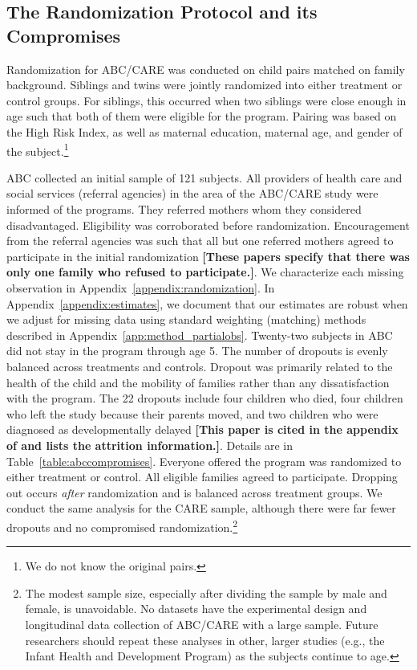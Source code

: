 \subsection{The Randomization Protocol and its Compromises} \label{section:randomization}

Randomization for ABC/CARE was conducted on child pairs matched on family background. Siblings and twins were jointly randomized into either treatment or control groups. For siblings, this occurred when two siblings were close enough in age such that both of them were eligible for the program. Pairing was based on the High Risk Index, as well as maternal education, maternal age, and gender of the subject.\footnote{We do not know the original pairs.} 

ABC collected an initial sample of 121 subjects. All providers of health care and social services (referral agencies) in the area of the ABC/CARE study were informed of the programs. They referred mothers whom they considered disadvantaged. Eligibility was corroborated before randomization. Encouragement from the referral agencies was such that all but one referred mothers agreed to participate in the initial randomization \citep{Ramey_Yeates_Short_1984_CD,Campbell_Ramey_1995_AERJ} \textbf{[These papers specify that there was only one family who refused to participate.]}. We characterize each missing observation in Appendix~\ref{appendix:randomization}. In Appendix~\ref{appendix:estimates}, we document that our estimates are robust when we adjust for missing data using standard weighting (matching) methods described in Appendix~\ref{app:method_partialobs}. Twenty-two subjects in ABC did not stay in the program through age 5. The number of dropouts is evenly balanced across treatments and controls. Dropout was primarily related to the health of the child and the mobility of families rather than any dissatisfaction with the program. The 22 dropouts include four children who died, four children who left the study because their parents moved, and two children who were diagnosed as developmentally delayed \citep{Burchinal_Campbell_etal_1997_CD} \textbf{[This paper is cited in the appendix of \citet{Campbell_Conti_etal_2014_EarlyChildhoodInvestments} and lists the attrition information.]}. Details are in Table~\ref{table:abccompromises}. Everyone offered the program was randomized to either treatment or control. All eligible families agreed to participate. Dropping out occurs \emph{after} randomization and is balanced across treatment groups. We conduct the same analysis for the CARE sample, although there were far fewer dropouts and no compromised randomization.\footnote{The modest sample size, especially after dividing the sample by male and female, is unavoidable. No datasets have the experimental design and longitudinal data collection of ABC/CARE with a large sample. Future researchers should repeat these analyses in other, larger studies (e.g., the Infant Health and Development Program) as the subjects continue to age.} 

